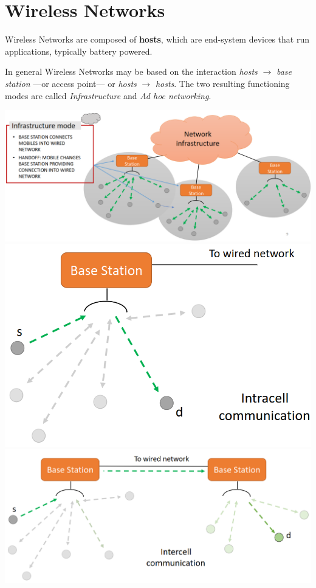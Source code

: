 \chapter{Wireless Networks}
Wireless Networks are composed of \textbf{hosts}, which are end-system devices that run
applications, typically battery powered.

In general Wireless Networks may be based on the interaction \textit{hosts} $\longrightarrow$ \textit{base station} ---or access point--- or \textit{hosts} $\longrightarrow$ \textit{hosts}.
The two resulting functioning modes are called \textit{Infrastructure} and \textit{Ad hoc networking}.

\begin{paracol}{2}
   \colfill
   \includegraphics[width=0.9\columnwidth]{images/wirelessnet_infrastructure.png}
   \colfill
   \switchcolumn
   \colfill
   \includegraphics[width=0.9\columnwidth]{images/wirelessnet_cell1.png}\\
   \includegraphics[width=0.9\columnwidth]{images/wirelessnet_cell2.png}
   \colfill
\end{paracol}

